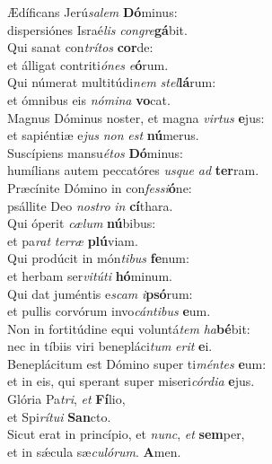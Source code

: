 \evenverse Ædíficans Jerú\textit{sa}\textit{lem} \textbf{Dó}minus:~\*\\
\evenverse dispersiónes Israé\textit{lis} \textit{con}\textit{gre}\textbf{gá}bit.\\
\oddverse Qui sanat con\textit{trí}\textit{tos} \textbf{cor}de:~\*\\
\oddverse et álligat contriti\textit{ó}\textit{nes} \textit{e}\textbf{ó}rum.\\
\evenverse Qui númerat multitúdi\textit{nem} \textit{stel}\textbf{lá}rum:~\*\\
\evenverse et ómnibus eis \textit{nó}\textit{mi}\textit{na} \textbf{vo}cat.\\
\oddverse Magnus Dóminus noster, et magna \textit{vir}\textit{tus} \textbf{e}jus:~\*\\
\oddverse et sapiéntiæ e\textit{jus} \textit{non} \textit{est} \textbf{nú}merus.\\
\evenverse Suscípiens mansu\textit{é}\textit{tos} \textbf{Dó}minus:~\*\\
\evenverse humílians autem peccatóres \textit{us}\textit{que} \textit{ad} \textbf{ter}ram.\\
\oddverse Præcínite Dómino in con\textit{fes}\textit{si}\textbf{ó}ne:~\*\\
\oddverse psállite Deo \textit{no}\textit{stro} \textit{in} \textbf{cí}thara.\\
\evenverse Qui óperit \textit{cæ}\textit{lum} \textbf{nú}bibus:~\*\\
\evenverse et pa\textit{rat} \textit{ter}\textit{ræ} \textbf{plú}viam.\\
\oddverse Qui prodúcit in món\textit{ti}\textit{bus} \textbf{fe}num:~\*\\
\oddverse et herbam ser\textit{vi}\textit{tú}\textit{ti} \textbf{hó}minum.\\
\evenverse Qui dat juméntis e\textit{scam} \textit{i}\textbf{psó}rum:~\*\\
\evenverse et pullis corvórum invo\textit{cán}\textit{ti}\textit{bus} \textbf{e}um.\\
\oddverse Non in fortitúdine equi voluntá\textit{tem} \textit{ha}\textbf{bé}bit:~\*\\
\oddverse nec in tíbiis viri benepláci\textit{tum} \textit{e}\textit{rit} \textbf{e}i.\\
\evenverse Beneplácitum est Dómino super ti\textit{mén}\textit{tes} \textbf{e}um:~\*\\
\evenverse et in eis, qui sperant super miseri\textit{cór}\textit{di}\textit{a} \textbf{e}jus.\\
\oddverse Glória Pa\textit{tri}, \textit{et} \textbf{Fí}lio,~\*\\
\oddverse et Spi\textit{rí}\textit{tu}\textit{i} \textbf{San}cto.\\
\evenverse Sicut erat in princípio, et \textit{nunc}, \textit{et} \textbf{sem}per,~\*\\
\evenverse et in sǽcula sæ\textit{cu}\textit{ló}\textit{rum}. \textbf{A}men.\\
